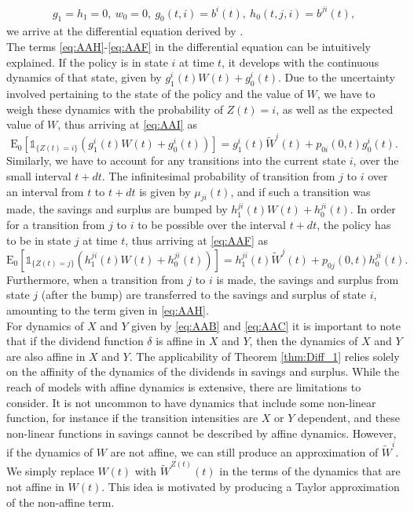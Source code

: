 \documentclass[12pt]{article}
\newcommand{\E}{\text{E}}
\newcommand{\indic}[1]{\mathds{1}_{ \{ #1 \} }}
\theoremstyle{my_thm}
\theoremstyle{my_rem}
\newenvironment{remark}
  {\pushQED{\qed}\renewcommand{\qedsymbol}{$\triangle$}\remarkex}
  {\popQED\endremarkex}
\begin{document}
\begin{gather*}
g_1=h_1=0,\ w_0=0,\ g_0(t,i)=b^{i}(t),\ h_0(t,j,i)=b^{ji}(t),
\end{gather*}
we arrive at the differential equation derived by \citet{Norberg}.
\\[12pt]
The terms \eqref{eq:AAH}-\eqref{eq:AAF} in the differential equation can be intuitively explained. If the policy is in state $i$ at time $t$, it develops with the continuous dynamics of that state, given by $g^i_1(t)W(t)+g_0^i(t)$. Due to the uncertainty involved pertaining to the state of the policy and the value of $W$, we have to weigh these dynamics with the probability of $Z(t)=i$, as well as the expected value of $W$, thus arriving at \eqref{eq:AAI} as
$$
\E_0 \left[\indic{Z(t)=i} \left(g^i_1(t)W(t)+g_0^i(t)\right)\right]= g_1^i(t)\tilde{W}^i(t)+p_{0i}(0,t)g_0^i(t).
$$
Similarly, we have to account for any transitions into the current state $i$, over the small interval $t+dt$. The infinitesimal probability of transition from $j$ to $i$ over an interval from $t$ to $t+dt$ is given by $\mu_{ji}(t)$, and if such a transition was made, the savings and surplus are bumped by $h^{ji}_1(t)W(t)+h^{ji}_0(t)$. In order for a transition from $j$ to $i$ to be possible over the interval $t+dt$, the policy has to be in state $j$ at time $t$, thus arriving at 
\eqref{eq:AAF} as
$$
\E_0\left[ \indic{Z(t)=j} \left( h_1^{ji}(t)W(t)+ h_0^{ji}(t)\right)\right]= h_1^{ji}(t)\tilde{W}^j(t)+ p_{0j}(0,t)h_0^{ji}(t).
$$
Furthermore, when a transition from $j$ to $i$ is made, the savings and surplus from state $j$ (after the bump) are transferred to the savings and surplus of state $i$, amounting to the term given in \eqref{eq:AAH}. 
\\[12pt]
For dynamics of $X$ and $Y$ given by \eqref{eq:AAB} and \eqref{eq:AAC} it is important to note that if the dividend function $\delta$ is affine in $X$ and $Y$, then the dynamics of $X$ and $Y$ are also affine in $X$ and $Y$. The applicability of Theorem \ref{thm:Diff_1} relies solely on the affinity of the dynamics of the dividends in savings and surplus.
\begin{remark}[Non-linear dynamics]
While the reach of models with affine dynamics is extensive, there are limitations to consider. It is not uncommon to have dynamics that include some non-linear function, for instance if the transition intensities are $X$ or $Y$ dependent, and these non-linear functions in savings cannot be described by affine dynamics. However, if the dynamics of $W$ are not affine, we can still produce an approximation of $\tilde{W}^i$. We simply replace $W(t)$ with $\tilde{W}^{Z(t)}(t)$ in the terms of the dynamics that are not affine in $W(t)$. This idea is motivated by producing a Taylor approximation of the non-affine term.
\end{remark}
\end{document}
